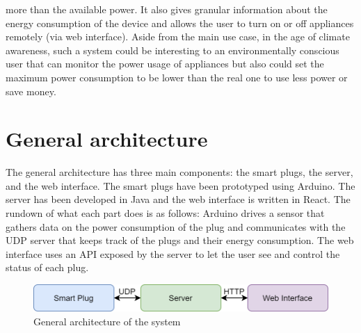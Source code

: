 \documentclass[conference]{IEEEtran}
\begin{document}
more than the available power. It also gives granular information about the energy consumption of the device and allows the user to turn on or off appliances remotely (via web interface). Aside from the main use case, in the age of climate awareness, such a system could be interesting to an environmentally conscious user that can monitor the power usage of appliances but also could set the maximum power consumption to be lower than the real one to use less power or save money. 

\section{General architecture}
The general architecture has three main components: the smart plugs, the server, and the web interface. The smart plugs have been prototyped using Arduino. The server has been developed in Java and the web interface is written in React. The rundown of what each part does is as follows: Arduino drives a sensor that gathers data on the power consumption of the plug and communicates with the UDP server that keeps track of the plugs and their energy consumption. The web interface uses an API exposed by the server to let the user see and control the status of each plug.
\begin{figure}[htbp]
	\centering
	\includegraphics[width=\linewidth]{assets/architecture_schema}
	\caption{General architecture of the system}
	\label{fig:architecture_schema}
\end{figure}
\end{document}
